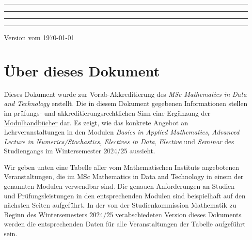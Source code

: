 \documentclass[11pt,a4paper]{article}
\begin{document}
\hrule\vskip1pt\hrule\medskip


\medskip
{}

\bigskip
{}

\medskip\hrule\vskip1pt\hrule

\bigskip
\bigskip

\setlength{\baselineskip}{20pt}
\hfill Version vom \today

\thispagestyle{empty}
\clearpage
\tableofcontents

\clearpage
{}


\section*{Über dieses Dokument}

Dieses Dokument wurde zur Vorab-Akkreditierung des {\em MSc Mathematics in Data and Technology} erstellt. Die in diesem Dokument gegebenen Informationen stellen im prüfungs- und akkreditierungsrechtlichen Sinn eine Ergänzung der \href{https://www.math.uni-freiburg.de/lehre/pruefungsamt/modulhandbuecher.html}{Modulhandbücher} dar. Es zeigt, wie das konkrete Angebot an Lehrveranstaltungen in den Modulen {\em Basics in Applied Mathematics}, {\em Advanced Lecture in Numerics/Stochastics}, {\em Electives in Data}, {\em Elective} und {\em Seminar} des Studiengangs im Wintersemester 2024/25 aussieht. 

Wir geben unten eine Tabelle aller vom Mathematischen Instituts angebotenen Veranstaltungen, die im MSc Mathematics in Data and Technology in einem der genannten Modulen verwendbar sind. Die genauen Anforderungen an Studien- und Prüfungsleistungen in den entsprechenden Modulen sind beispielhaft auf den nächsten Seiten aufgeführt. In der von der Studienkommission Mathematik zu Beginn des Wintersemesters 2024/25 verabschiedeten Version dieses Dokuments werden die entsprechenden Daten für alle Veranstaltungen der Tabelle aufgeführt sein.
\end{document}

